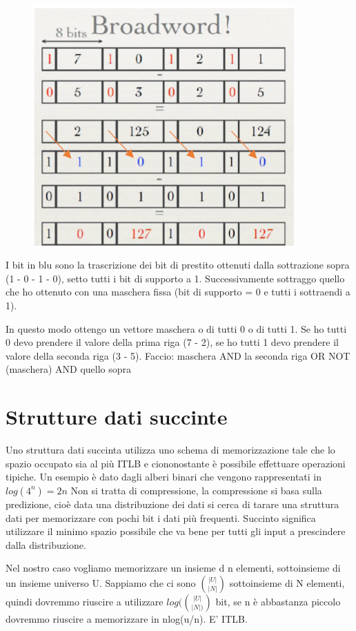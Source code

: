 \documentclass[12pt,italian]{report}
\begin{document}
\begin{figure}[h]
	\centering
	\includegraphics[width=100mm]{image/broad2.png}
	\label{fig:br2}
\end{figure}

I bit in blu sono la trascrizione dei bit di prestito ottenuti dalla sottrazione sopra (1 - 0 - 1 - 0), setto tutti i bit di supporto a 1. Successivamente sottraggo quello che ho ottenuto con una maschera fissa (bit di supporto = 0 e tutti i sottraendi a 1). 

In questo modo ottengo un vettore maschera o di tutti 0 o di tutti 1. Se ho tutti 0 devo prendere il valore della prima riga (7 - 2), se ho tutti 1 devo prendere il valore della seconda riga (3 - 5). 
\bigbreak
Faccio: maschera AND la seconda riga OR NOT (maschera) AND quello sopra

\chapter{Strutture dati succinte}
\label{cap:strutturedatisuccinte}
Uno struttura dati succinta utilizza uno schema di memorizzazione tale che lo spazio occupato sia al più ITLB e ciononostante è possibile effettuare operazioni tipiche. Un esempio è dato dagli alberi binari che vengono rappresentati in $log(4^n) = 2n$
\bigbreak
Non si tratta di compressione, la compressione si basa sulla predizione, cioè data una distribuzione dei dati si cerca di tarare una struttura dati per memorizzare con pochi bit i dati più frequenti. Succinto significa utilizzare il minimo spazio possibile che va bene per tutti gli input a prescindere dalla distribuzione. 

Nel nostro caso vogliamo memorizzare un insieme d n elementi, sottoinsieme di un insieme universo U. Sappiamo che ci sono $\binom{|U|}{|N|}$ sottoinsieme di N elementi, quindi dovremmo riuscire a utilizzare $log(\binom{|U|}{|N|)}$ bit, se n è abbastanza piccolo dovremmo riuscire a memorizzare in nlog(u/n). E' ITLB.
\end{document}
